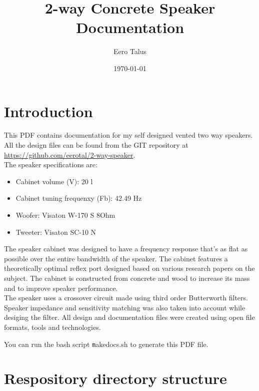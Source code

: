 \documentclass[10pt]{article}
\title{2-way Concrete Speaker Documentation}
\author{Eero Talus}
\date{\today}
\begin{document}
\maketitle
\tableofcontents

\section{Introduction}

\noindent This PDF contains documentation for my self designed vented two way
speakers. All the design files can be found from the GIT repository at
\url{https://github.com/eerotal/2-way-speaker}.\\

\noindent The speaker specifications are:

\begin{itemize}
\item Cabinet volume (V): 20 l
\item Cabinet tuning frequenxy (Fb): 42.49 Hz
\item Woofer: Visaton W-170 S 8Ohm
\item Tweeter: Visaton SC-10 N
\end{itemize}

\noindent The speaker cabinet was designed to have a frequency response that's
as flat as possible over the entire bandwidth of the speaker. The cabinet
features a theoretically optimal reflex port designed based on various research
papers on the subject. The cabinet is constructed from concrete and wood to
increase its mass and to improve speaker performance.\\

\noindent The speaker uses a crossover circuit made using third order
Butterworth filters. Speaker impedance and sensitivity matching was also taken
into account while desiging the filter. All design and documentation files were
created using open file formats, tools and technologies.

\noindent You can run the bash script \texttt makedocs.sh to generate this
PDF file.

\section{Respository directory structure}
\end{document}
